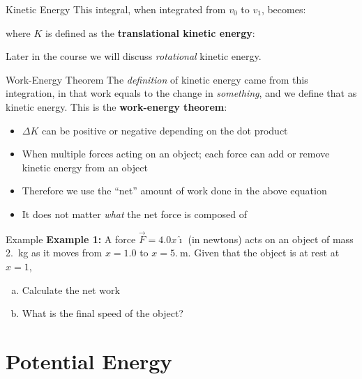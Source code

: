 \documentclass[12pt,compress,aspectratio=169]{beamer}
\begin{document}
\begin{frame}{Kinetic Energy}
  This integral, when integrated from $v_0$ to $v_1$, becomes:

  
  where $K$ is defined as the \textbf{translational kinetic energy}:


  Later in the course we will discuss \emph{rotational} kinetic energy.
\end{frame}



\begin{frame}{Work-Energy Theorem}
  The \emph{definition} of kinetic energy came from this integration, in that
  work equals to the change in \emph{something}, and we define that as kinetic
  energy. This is the \textbf{work-energy theorem}:

  \begin{itemize}
  \item $\Delta K$ can be positive or negative depending on the dot product
  \item When multiple forces acting on an object; each force can add or remove
    kinetic energy from an object
  \item Therefore we use the ``net'' amount of work done in the above equation
  \item It does not matter \emph{what} the net force is composed of
  \end{itemize}
\end{frame}



\begin{frame}{Example}
  \textbf{Example 1:} A force $\vec F=4.0x\hat\imath$ (in newtons) acts
  on an object of mass \SI{2.}{\kilo\gram} as it moves from $x=1.0$ to
  $x=\SI{5.}\metre$. Given that the object is at rest at $x=1$,
  \begin{enumerate}[(a)]
  \item Calculate the net work
  \item What is the final speed of the object?
  \end{enumerate}
\end{frame}



\section{Potential Energy}
\end{document}
